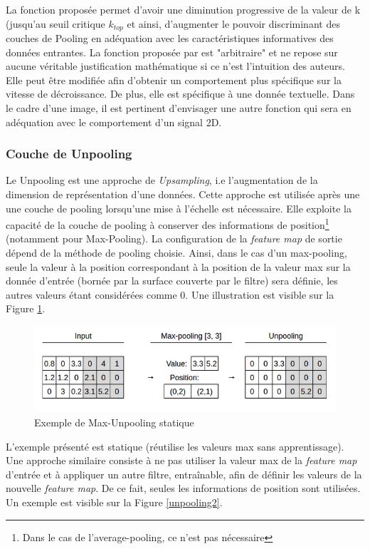 \noindent La fonction proposée permet d'avoir une diminution progressive de la valeur de k (jusqu'au seuil critique $k_{top}$ et ainsi, d'augmenter le pouvoir discriminant des couches de Pooling en adéquation avec les caractéristiques informatives des données entrantes. La fonction proposée par \cite{kmaxpool} est "arbitraire" et ne repose sur aucune véritable justification mathématique si ce n'est l'intuition des auteurs. Elle peut être modifiée afin d'obtenir un comportement plus spécifique sur la vitesse de décroissance. De plus, elle est spécifique à une donnée textuelle. Dans le cadre d'une image, il est pertinent d'envisager une autre fonction qui sera en adéquation avec le comportement d'un signal 2D.

\subsubsection{Couche de Unpooling}
Le Unpooling est une approche de \textit{Upsampling}, i.e l'augmentation de la dimension de représentation d'une données. Cette approche est utilisée après une une couche de pooling lorsqu'une mise à l'échelle est nécessaire. Elle exploite la capacité de la couche de pooling à conserver des informations de position\footnote{Dans le cas de l'average-pooling, ce n'est pas nécessaire} (notamment pour Max-Pooling). La configuration de la \textit{feature map} de sortie dépend de la méthode de pooling choisie. Ainsi, dans le cas d'un max-pooling, seule la valeur à la position correspondant à la position de la valeur max sur la donnée d'entrée (bornée par la surface couverte par le filtre) sera définie, les autres valeurs étant considérées comme 0. Une illustration est visible sur la Figure \ref{unpooling}. \\

\begin{figure}
    \centering
    \includegraphics[scale=0.4]{./tex/convolution-network/cnn/unpooling2.png}
    \caption{Exemple de Max-Unpooling statique}
    \label{unpooling}
\end{figure}

\noindent L'exemple présenté est statique (réutilise les valeurs max sans apprentissage). Une approche similaire consiste à ne pas utiliser la valeur max de la \textit{feature map} d'entrée et à appliquer un autre filtre, entraînable, afin de définir les valeurs de la nouvelle \textit{feature map}. De ce fait, seules les informations de position sont utilisées. Un exemple est visible sur la Figure \ref{unpooling2}.

